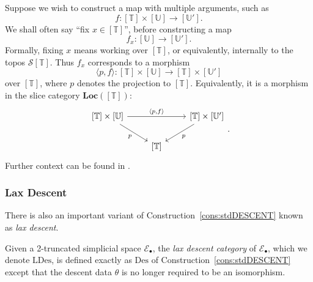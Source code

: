 \documentclass[a4paper, 11pt,reqno]{amsart}
\newcommand{\baseS}{\mathcal{S}}
\newcommand{\thT}{\mathbb{T}}
\newcommand{\thU}{\mathbb{U}}
\newcommand{\Des}{\mathrm{Des}}
\newcommand{\lranglet}[2]{\langle#1,#2\rangle}
\newcommand{\LDes}{\mathrm{LDes}}
\begin{document}

\begin{convention}[``Fixing $x$'']\label{conv:fixingx} Suppose we wish to construct a map with multiple arguments, such as
	\[
	f\colon[\thT]\times [\thU]\rightarrow [\thU'].
	\]
We shall often say ``fix $x\in [\thT]$'', before constructing a map
	\[
	f_{x}\colon[\thU]\rightarrow [\thU']
	\text{.}
	\]
Formally, fixing $x$ means working over $[\thT]$, or equivalently, internally to the topos $\baseS[\thT]$. Thus $f_x$ corresponds to a morphism
$$\langle p,f\rangle\colon[\thT]\times[\thU]\longrightarrow[\thT]\times[\thU']$$
over $[\thT]$, where $p$ denotes the projection to $[\thT]$. Equivalently, it is a morphism in the slice category $\mathbf{Loc}([\thT])$:
\begin{equation}
\begin{tikzcd}
{[\thT]\times[\thU]}
\ar[rr, "{\langle p, f\rangle}"]
\ar[dr, swap, "p"]
&& {[\thT]\times[\thU']}
\ar[dl, "p"]
\\
& {[\thT]}
\end{tikzcd}.
\end{equation}
Further context can be found in \cite[\S 9]{VickersPtfreePtwise}.
\end{convention}


\subsubsection{Lax Descent} There is also an important variant of Construction~\ref{cons:stdDESCENT} known as {\em lax descent}.

\begin{construction}\label{cons:LAXdescent} Given a 2-truncated simplicial space $\mathcal{E}_{\bullet}$, the \emph{lax descent category} of $\mathcal{E}_\bullet$, which we denote $\LDes$, is defined exactly as $\Des$ of Construction~\ref{cons:stdDESCENT} except that the descent data $\theta$ is no longer required to be an isomorphism.
\end{construction}
\end{document}
